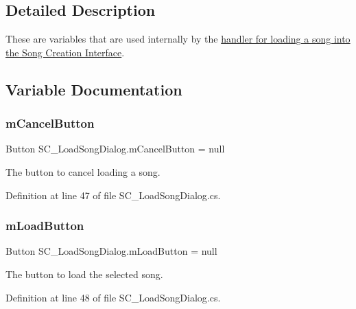\subsection{Detailed Description}
These are variables that are used internally by the \hyperlink{group___doc_s_c___l_s_d}{handler for loading a song into the Song Creation Interface}. 

\subsection{Variable Documentation}
\mbox{\label{group___s_c___l_s_d_priv_var_ga31e17d7ca1cb32f0ad75ef8c7235873f}} 
\subsubsection{\texorpdfstring{m\+Cancel\+Button}{mCancelButton}}
{\footnotesize\ttfamily Button S\+C\+\_\+\+Load\+Song\+Dialog.\+m\+Cancel\+Button = null\hspace{0.3cm}{\ttfamily [private]}}



The button to cancel loading a song. 



Definition at line 47 of file S\+C\+\_\+\+Load\+Song\+Dialog.\+cs.

\mbox{\label{group___s_c___l_s_d_priv_var_gaa27cfb6231ef826024dd063828efa364}} 
\subsubsection{\texorpdfstring{m\+Load\+Button}{mLoadButton}}
{\footnotesize\ttfamily Button S\+C\+\_\+\+Load\+Song\+Dialog.\+m\+Load\+Button = null\hspace{0.3cm}{\ttfamily [private]}}



The button to load the selected song. 



Definition at line 48 of file S\+C\+\_\+\+Load\+Song\+Dialog.\+cs.


